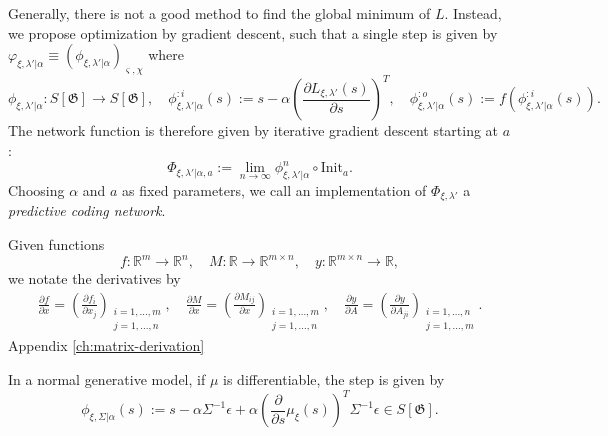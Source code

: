 \documentclass[a4paper,11pt]{report}
\newcommand{\const}{\varsigma} %
\newcommand{\var}{\chi} %
\newcommand{\In}{\text{Init}}
\begin{document}
\begin{Par}
Generally, there is not a good method to find the global minimum of $L$. Instead, we propose optimization by gradient descent, such that a single step is given by $\varphi_{\xi,\lambda'|\alpha}\equiv\left(\phi_{\xi,\lambda'|\alpha}\right)_{\const,\var}$ where
\begin{equation}\label{eq:phi}
\phi_{\xi,\lambda'|\alpha}:S[\mathfrak{G}]\to S[\mathfrak{G}],
\quad
\phi_{\xi,\lambda'|\alpha}^{:i}(s):=s-\alpha\left(\frac{\partial L_{\xi,\lambda'}(s)}{\partial s}\right)^T,
\quad
\phi_{\xi,\lambda'|\alpha}^{:o}(s):=f\left(\phi_{\xi,\lambda'|\alpha}^{:i}(s)\right).
\end{equation}
The network function is therefore given by iterative gradient descent starting at $a$:
\begin{equation}
\Phi_{\xi,\lambda'|\alpha,a}:=\lim_{n\to\infty}\phi_{\xi,\lambda'|\alpha}^n\circ\In_a.
\end{equation}
Choosing $\alpha$ and $a$ as fixed parameters, we call an implementation of $\Phi_{\xi,\lambda'}$ a \emph{predictive coding network}.
\end{Par}

\begin{Not}\label{matrix-derivation-not}
Given functions
\[
f:\mathbb{R}^m\to\mathbb{R}^n,
\quad
M:\mathbb{R}\to\mathbb{R}^{m\times n},
\quad
y:\mathbb{R}^{m\times n}\to\mathbb{R},
\]
we notate the derivatives by
\begin{align*}
\frac{\partial f}{\partial x}=\left(\frac{\partial f_i}{\partial x_j}\right)_{\substack{i=1,\dotsc,m\\j=1,\dotsc,n}},
\quad
\frac{\partial M}{\partial x}=\left(\frac{\partial M_{ij}}{\partial x}\right)_{\substack{i=1,\dotsc,m\\j=1,\dotsc,n}},
\quad
\frac{\partial y}{\partial A}=\left(\frac{\partial y}{\partial A_{ji}}\right)_{\substack{i=1,\dotsc,n\\j=1,\dotsc,m}}.
\end{align*}
Appendix \ref{ch:matrix-derivation}
\end{Not}

\begin{Lem}\label{lem:grad-desc-normal}
In a normal generative model, if $\mu$ is differentiable, the step is given by
\begin{equation}\label{eq:normal-gradient-descent}
\phi_{\xi,\Sigma|\alpha}(s):=s-
\alpha\Sigma^{-1}\epsilon
+
\alpha\left(\frac{\partial}{\partial s}\mu_{\xi}(s)\right)^T\Sigma^{-1}\epsilon
\in 
S[\mathfrak{G}].
\end{equation}
\end{Lem}
\end{document}
